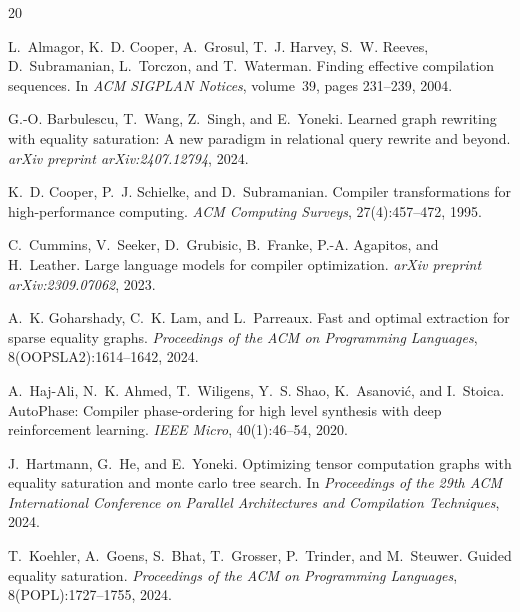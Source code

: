 \documentclass{article}
\begin{document}

\begin{thebibliography}{20}

L.~Almagor, K.~D. Cooper, A.~Grosul, T.~J. Harvey, S.~W. Reeves, D.~Subramanian, L.~Torczon, and T.~Waterman.
\newblock Finding effective compilation sequences.
\newblock In \emph{ACM SIGPLAN Notices}, volume~39, pages 231--239, 2004.

G.-O. Barbulescu, T.~Wang, Z.~Singh, and E.~Yoneki.
\newblock Learned graph rewriting with equality saturation: A new paradigm in relational query rewrite and beyond.
\newblock \emph{arXiv preprint arXiv:2407.12794}, 2024.

K.~D. Cooper, P.~J. Schielke, and D.~Subramanian.
\newblock Compiler transformations for high-performance computing.
\newblock \emph{ACM Computing Surveys}, 27(4):457--472, 1995.

C.~Cummins, V.~Seeker, D.~Grubisic, B.~Franke, P.-A. Agapitos, and H.~Leather.
\newblock Large language models for compiler optimization.
\newblock \emph{arXiv preprint arXiv:2309.07062}, 2023.

A.~K. Goharshady, C.~K. Lam, and L.~Parreaux.
\newblock Fast and optimal extraction for sparse equality graphs.
\newblock \emph{Proceedings of the ACM on Programming Languages}, 8(OOPSLA2):1614--1642, 2024.

A.~Haj-Ali, N.~K. Ahmed, T.~Wiligens, Y.~S. Shao, K.~Asanovi\'{c}, and I.~Stoica.
\newblock AutoPhase: Compiler phase-ordering for high level synthesis with deep reinforcement learning.
\newblock \emph{IEEE Micro}, 40(1):46--54, 2020.

J.~Hartmann, G.~He, and E.~Yoneki.
\newblock Optimizing tensor computation graphs with equality saturation and monte carlo tree search.
\newblock In \emph{Proceedings of the 29th ACM International Conference on Parallel Architectures and Compilation Techniques}, 2024.

T.~Koehler, A.~Goens, S.~Bhat, T.~Grosser, P.~Trinder, and M.~Steuwer.
\newblock Guided equality saturation.
\newblock \emph{Proceedings of the ACM on Programming Languages}, 8(POPL):1727--1755, 2024.


\end{thebibliography}
\end{document}
